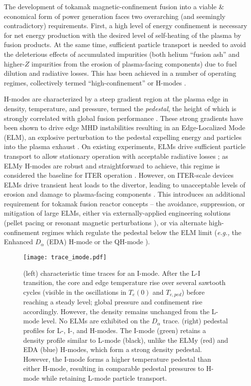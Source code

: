 \documentclass[12pt,floatfix,showpacs]{revtex4-1}
\newcommand{\eg}{\emph{e.g., }}
\begin{document}
The development of tokamak magnetic-confinement fusion into a viable \& economical form of power generation faces two overarching (and seemingly contradictory) requirements.  
First, a high level of energy confinement is necessary for net energy production with the desired level of self-heating of the plasma by fusion products.  
At the same time, sufficient particle transport is needed to avoid the deleterious effects of accumulated impurities (both helium ``fusion ash'' and higher-$Z$ impurities from the erosion of plasma-facing components) due to fuel dilution and radiative losses.  
This has been achieved in a number of operating regimes, collectively termed ``high-confinement'' or H-modes \cite{Wagner1982}.  

H-modes are characterized by a steep gradient region at the plasma edge in density, temperature, and pressure, termed the \emph{pedestal}, the height of which is strongly correlated with global fusion performance \cite{Kinsey2011}.  
These strong gradients have been shown to drive edge MHD instabilities \cite{Huysmans2005,Maget2013,Snyder2002} resulting in an Edge-Localized Mode (ELM), an explosive perturbation to the pedestal expelling energy and particles into the plasma exhaust \cite{Zohm1996}.  
On existing experiments, ELMs drive sufficient particle transport to allow stationary operation with acceptable radiative losses \cite{Keilhacker1984}; as ELMy H-modes are robust and straightforward to achieve, this regime is considered the baseline for ITER operation \cite{ITER1999,Shimada2007}.  
However, on ITER-scale devices ELMs drive transient heat loads to the divertor, leading to unacceptable levels of erosion and damage to plasma-facing components \cite{Loarte2003,Federici2003}.
This introduces an additional requirement for tokamak fusion reactor concepts -- the avoidance, suppression, or mitigation of large ELMs, either via externally-applied engineering solutions (pellet pacing \cite{Baylor2013,Lang2014} or resonant magnetic perturbations \cite{Evans2004,Evans2006}), or via alternate high-confinement regimes which regulate the pedestal below the ELM limit (\eg the Enhanced $D_\alpha$ (EDA) H-mode \cite{Greenwald1999,Hubbard2001} or the QH-mode \cite{Burrell2002,Suttrop2005}).

\begin{figure}[p] %
 \texttt{[image: trace\_imode.pdf]}
 \caption{(left) characteristic time traces for an I-mode.  After the L-I transition, the core and edge temperature rise over several sawtooth cycles (visible in the oscillations in $T_e(0)$ and $T_{e,ped}$) before reaching a steady level; global pressure and confinement rise accordingly.  However, the density remains unchanged from the L-mode level.  No ELMs are exhibited on the $D_\alpha$ trace.  (right) pedestal profiles for L-, I-, and H-modes.  The I-mode (green) retains a density profile similar to L-mode (black), unlike the ELMy (red) and EDA (blue) H-modes, which form a strong density pedestal.  However, the I-mode forms a higher temperature pedestal than either H-mode, resulting in comparable pedestal pressures to H-mode while retaining L-mode particle transport.}
 \label{fig:imode_trace}
\end{figure}
\end{document}
